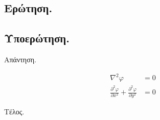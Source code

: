 \documentclass[10pt,landscape]{article}
\providecommand*{\pd}[3][]{\frac{\partial^{#1}#2}{\partial #3^{#1}}}
\begin{document}
\renewcommand{\thesubsection}{{}(\alph{subsection})}

\renewcommand{\textdexiakeraia}{}

\addto\captionsgreek{
 \renewcommand{\figurename}{Διάγραμμα}
    \renewcommand{\bibname}{Βιβλιογραφία}
    \renewcommand{\refname}{Βιβλιογραφία}
}

\begin{multicols}{3}

\section{Ερώτηση.}

\subsection{Υποερώτηση.}

Απάντηση.

\begin{align*}
    \displaystyle %
    \nabla^2\varphi                         &= 0 \\
    \pd[2]{\varphi}{x} + \pd[2]{\varphi}{y} &= 0
\end{align*}

Τέλος.

\end{multicols}


%
%
%
\end{document}
